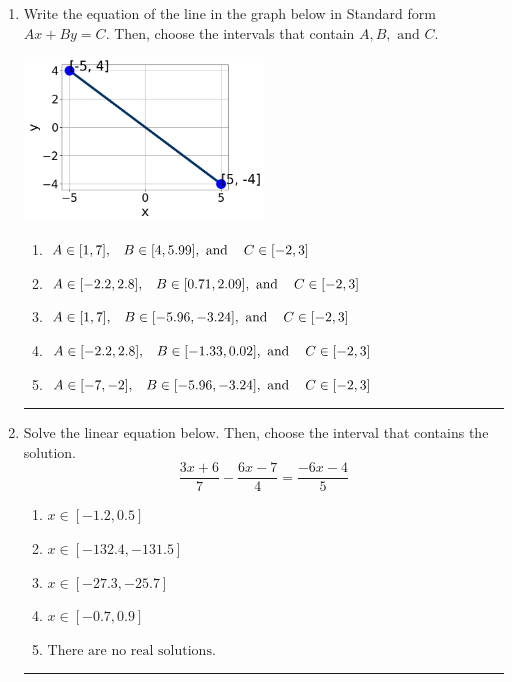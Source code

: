 \documentclass[14pt]{extbook}
\newcommand{\litem}[1]{\item#1\hspace*{-1cm}\rule{\textwidth}{0.4pt}}
\begin{document}
\begin{enumerate}
{\begin{enumerate}[label=\Alph*.]
\end{enumerate} }
\litem{
Write the equation of the line in the graph below in Standard form $Ax+By=C$. Then, choose the intervals that contain $A, B, \text{ and } C$.
\begin{center}
    \includegraphics[width=0.5\textwidth]{../Figures/linearGraphToStandardA.png}
\end{center}
\begin{enumerate}[label=\Alph*.]
\item \( A \in [1, 7], \hspace{3mm} B \in [4, 5.99], \text{ and } \hspace{3mm} C \in [-2, 3] \)
\item \( A \in [-2.2, 2.8], \hspace{3mm} B \in [0.71, 2.09], \text{ and } \hspace{3mm} C \in [-2, 3] \)
\item \( A \in [1, 7], \hspace{3mm} B \in [-5.96, -3.24], \text{ and } \hspace{3mm} C \in [-2, 3] \)
\item \( A \in [-2.2, 2.8], \hspace{3mm} B \in [-1.33, 0.02], \text{ and } \hspace{3mm} C \in [-2, 3] \)
\item \( A \in [-7, -2], \hspace{3mm} B \in [-5.96, -3.24], \text{ and } \hspace{3mm} C \in [-2, 3] \)

\end{enumerate} }
\litem{
Solve the linear equation below. Then, choose the interval that contains the solution.\[ \frac{3x + 6}{7} - \frac{6x -7}{4} = \frac{-6x -4}{5} \]\begin{enumerate}[label=\Alph*.]
\item \( x \in [-1.2, 0.5] \)
\item \( x \in [-132.4, -131.5] \)
\item \( x \in [-27.3, -25.7] \)
\item \( x \in [-0.7, 0.9] \)
\item \( \text{There are no real solutions.} \)


\end{enumerate}}
\end{enumerate}
\end{document}
